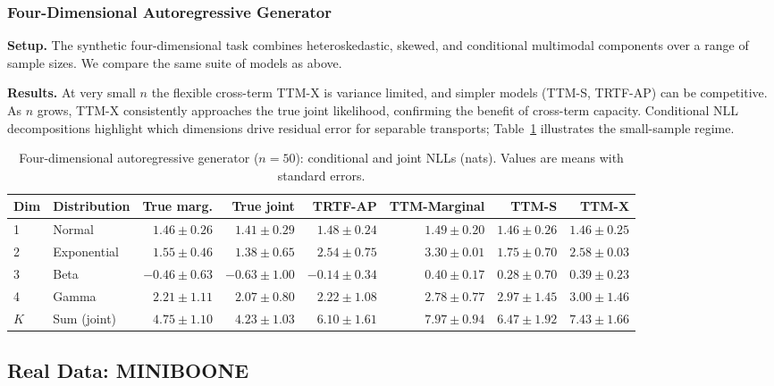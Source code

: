 \documentclass[11pt,a4paper,twoside]{book}\usepackage[]{graphicx}\usepackage[]{xcolor}
\begin{document}
\subsubsection{Four-Dimensional Autoregressive Generator}

\textbf{Setup.} The synthetic four-dimensional task combines heteroskedastic, skewed, and conditional multimodal components over a range of sample sizes. We compare the same suite of models as above.

\textbf{Results.} At very small $n$ the flexible cross-term TTM-X is variance limited, and simpler models (TTM-S, TRTF-AP) can be competitive. As $n$ grows, TTM-X consistently approaches the true joint likelihood, confirming the benefit of cross-term capacity. Conditional NLL decompositions highlight which dimensions drive residual error for separable transports; Table~\ref{tab:autoregressive-nll} illustrates the small-sample regime.

\begin{table}[htbp]
  \centering
  \caption{Four-dimensional autoregressive generator ($n=50$): conditional and joint NLLs (nats). Values are means with standard errors.}
  \label{tab:autoregressive-nll}
  \begin{tabular}{llrrrrrr}
    \hline
    Dim & Distribution & True marg. & True joint & TRTF-AP & TTM-Marginal & TTM-S & TTM-X \\ 
    \hline
    1 & Normal      & $1.46 \pm 0.26$ & $1.41 \pm 0.29$ & $1.48 \pm 0.24$ & $1.49 \pm 0.20$ & $1.46 \pm 0.26$ & $1.46 \pm 0.25$ \\ 
    2 & Exponential & $1.55 \pm 0.46$ & $1.38 \pm 0.65$ & $2.54 \pm 0.75$ & $3.30 \pm 0.01$ & $1.75 \pm 0.70$ & $2.58 \pm 0.03$ \\ 
    3 & Beta        & $-0.46 \pm 0.63$ & $-0.63 \pm 1.00$ & $-0.14 \pm 0.34$ & $0.40 \pm 0.17$ & $0.28 \pm 0.70$ & $0.39 \pm 0.23$ \\ 
    4 & Gamma       & $2.21 \pm 1.11$ & $2.07 \pm 0.80$ & $2.22 \pm 1.08$ & $2.78 \pm 0.77$ & $2.97 \pm 1.45$ & $3.00 \pm 1.46$ \\ 
    $K$ & Sum (joint) & $4.75 \pm 1.10$ & $4.23 \pm 1.03$ & $6.10 \pm 1.61$ & $7.97 \pm 0.94$ & $6.47 \pm 1.92$ & $7.43 \pm 1.66$ \\ 
    \hline
  \end{tabular}
\end{table}

\subsection{Real Data: MINIBOONE}
\end{document}

